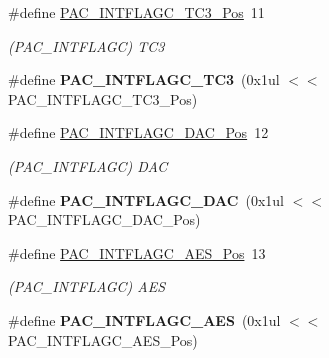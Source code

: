 \begin{DoxyCompactItemize}
\item 
\hypertarget{group___s_a_m_l21___p_a_c_ga06cc4c7529a3197a35b26bdb3b952cae}{}\#define \hyperlink{group___s_a_m_l21___p_a_c_ga06cc4c7529a3197a35b26bdb3b952cae}{P\+A\+C\+\_\+\+I\+N\+T\+F\+L\+A\+G\+C\+\_\+\+T\+C3\+\_\+\+Pos}~11\label{group___s_a_m_l21___p_a_c_ga06cc4c7529a3197a35b26bdb3b952cae}

\begin{DoxyCompactList}\small\item\em (P\+A\+C\+\_\+\+I\+N\+T\+F\+L\+A\+G\+C) T\+C3 \end{DoxyCompactList}\item 
\hypertarget{group___s_a_m_l21___p_a_c_ga09aef68f4a94089c68ad13fda4b1dc7d}{}\#define {\bfseries P\+A\+C\+\_\+\+I\+N\+T\+F\+L\+A\+G\+C\+\_\+\+T\+C3}~(0x1ul $<$$<$ P\+A\+C\+\_\+\+I\+N\+T\+F\+L\+A\+G\+C\+\_\+\+T\+C3\+\_\+\+Pos)\label{group___s_a_m_l21___p_a_c_ga09aef68f4a94089c68ad13fda4b1dc7d}

\item 
\hypertarget{group___s_a_m_l21___p_a_c_ga88d15efcdb6f95d3c72ce436ae25f98d}{}\#define \hyperlink{group___s_a_m_l21___p_a_c_ga88d15efcdb6f95d3c72ce436ae25f98d}{P\+A\+C\+\_\+\+I\+N\+T\+F\+L\+A\+G\+C\+\_\+\+D\+A\+C\+\_\+\+Pos}~12\label{group___s_a_m_l21___p_a_c_ga88d15efcdb6f95d3c72ce436ae25f98d}

\begin{DoxyCompactList}\small\item\em (P\+A\+C\+\_\+\+I\+N\+T\+F\+L\+A\+G\+C) D\+A\+C \end{DoxyCompactList}\item 
\hypertarget{group___s_a_m_l21___p_a_c_ga689ce87e3f4eb6be3f2a6e668bb60120}{}\#define {\bfseries P\+A\+C\+\_\+\+I\+N\+T\+F\+L\+A\+G\+C\+\_\+\+D\+A\+C}~(0x1ul $<$$<$ P\+A\+C\+\_\+\+I\+N\+T\+F\+L\+A\+G\+C\+\_\+\+D\+A\+C\+\_\+\+Pos)\label{group___s_a_m_l21___p_a_c_ga689ce87e3f4eb6be3f2a6e668bb60120}

\item 
\hypertarget{group___s_a_m_l21___p_a_c_ga907567b05744c1f2a034f8f730f72c47}{}\#define \hyperlink{group___s_a_m_l21___p_a_c_ga907567b05744c1f2a034f8f730f72c47}{P\+A\+C\+\_\+\+I\+N\+T\+F\+L\+A\+G\+C\+\_\+\+A\+E\+S\+\_\+\+Pos}~13\label{group___s_a_m_l21___p_a_c_ga907567b05744c1f2a034f8f730f72c47}

\begin{DoxyCompactList}\small\item\em (P\+A\+C\+\_\+\+I\+N\+T\+F\+L\+A\+G\+C) A\+E\+S \end{DoxyCompactList}\item 
\hypertarget{group___s_a_m_l21___p_a_c_gafa2dcf7bee82ce4aa400c173dadf3014}{}\#define {\bfseries P\+A\+C\+\_\+\+I\+N\+T\+F\+L\+A\+G\+C\+\_\+\+A\+E\+S}~(0x1ul $<$$<$ P\+A\+C\+\_\+\+I\+N\+T\+F\+L\+A\+G\+C\+\_\+\+A\+E\+S\+\_\+\+Pos)\label{group___s_a_m_l21___p_a_c_gafa2dcf7bee82ce4aa400c173dadf3014}


\end{DoxyCompactItemize}
